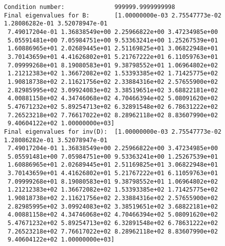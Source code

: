 \documentclass[11pt]{article}
\begin{document}
    \begin{Verbatim}[commandchars=\\\{\}]
Condition number:              999999.9999999998
Final eigenvalues for B:       [1.00000000e-03 2.75547773e-02 1.28086282e-01 3.52078947e-01
 7.49017204e-01 1.36838549e+00 2.25966822e+00 3.47234985e+00
 5.05591481e+00 7.05984751e+00 9.53363241e+00 1.25267539e+01
 1.60886965e+01 2.02689445e+01 2.51169825e+01 3.06822948e+01
 3.70143659e+01 4.41626802e+01 5.21767222e+01 6.11059763e+01
 7.09999268e+01 8.19080583e+01 9.38798552e+01 1.06964802e+02
 1.21212383e+02 1.36672082e+02 1.53393385e+02 1.71425775e+02
 1.90818738e+02 2.11621756e+02 2.33884316e+02 2.57655900e+02
 2.82985995e+02 3.09924083e+02 3.38519651e+02 3.68822181e+02
 4.00881158e+02 4.34746068e+02 4.70466394e+02 5.08091620e+02
 5.47671232e+02 5.89254713e+02 6.32891548e+02 6.78631222e+02
 7.26523218e+02 7.76617022e+02 8.28962118e+02 8.83607990e+02
 9.40604122e+02 1.00000000e+03]
Final eigenvalues for inv(D):  [1.00000000e-03 2.75547773e-02 1.28086282e-01 3.52078947e-01
 7.49017204e-01 1.36838549e+00 2.25966822e+00 3.47234985e+00
 5.05591481e+00 7.05984751e+00 9.53363241e+00 1.25267539e+01
 1.60886965e+01 2.02689445e+01 2.51169825e+01 3.06822948e+01
 3.70143659e+01 4.41626802e+01 5.21767222e+01 6.11059763e+01
 7.09999268e+01 8.19080583e+01 9.38798552e+01 1.06964802e+02
 1.21212383e+02 1.36672082e+02 1.53393385e+02 1.71425775e+02
 1.90818738e+02 2.11621756e+02 2.33884316e+02 2.57655900e+02
 2.82985995e+02 3.09924083e+02 3.38519651e+02 3.68822181e+02
 4.00881158e+02 4.34746068e+02 4.70466394e+02 5.08091620e+02
 5.47671232e+02 5.89254713e+02 6.32891548e+02 6.78631222e+02
 7.26523218e+02 7.76617022e+02 8.28962118e+02 8.83607990e+02
 9.40604122e+02 1.00000000e+03]

    \end{Verbatim}

    \begin{center}
    \end{center}
    { \hspace*{\fill} \\}
    
    \begin{center}
    \end{center}
    { \hspace*{\fill} \\}
    
    \begin{center}
    \end{center}
    { \hspace*{\fill} \\}
    

    
    
    
    
\end{document}
